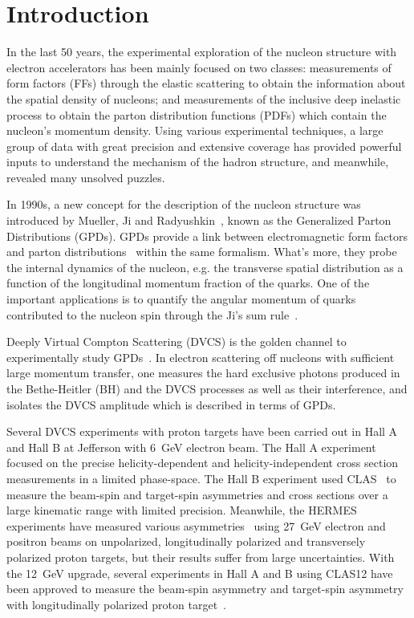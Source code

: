 \section {Introduction}
In the last 50 years, the experimental exploration of the nucleon structure with electron accelerators has been mainly focused on two classes: measurements of form factors (FFs) through the elastic scattering to obtain the information about the spatial density of nucleons; and measurements of the inclusive deep inelastic process to obtain the parton distribution functions (PDFs) which contain the nucleon's momentum density. Using various experimental techniques, a large group of data with great precision and extensive coverage has provided powerful inputs to understand the mechanism of the hadron structure, and meanwhile, revealed many unsolved puzzles.

In 1990s, a new concept for the description of the nucleon structure was introduced by Mueller, Ji and Radyushkin~\cite{Mueller:1998fv,Ji97-1,Ji97-2,Rad97}, known as the Generalized Parton Distributions (GPDs). GPDs provide a link between electromagnetic form factors and parton distributions~\cite{Die03,Bel05} within the same formalism. What's more, they probe the internal dynamics of the nucleon, e.g. the transverse spatial distribution as a function of the longitudinal momentum fraction of the quarks. One of the important applications is to quantify the angular momentum of quarks contributed to the nucleon spin through the Ji's sum rule~\cite{Ji97-1}.

Deeply Virtual Compton Scattering (DVCS) is the golden channel to experimentally study GPDs~\cite{Bel05}. In electron scattering off nucleons with sufficient large momentum transfer, one measures the hard exclusive photons produced in the Bethe-Heitler (BH) and the DVCS processes as well as their interference, and isolates the DVCS amplitude which is described in terms of GPDs.%

Several DVCS experiments with proton targets have been carried out in Hall A and Hall B at Jefferson with 6~GeV electron beam. The Hall A experiment~\cite{MunozCamacho:2006hx,Defurne:2015kxq} focused on the precise helicity-dependent and helicity-independent cross section measurements in a limited phase-space. The Hall B experiment used CLAS~\cite{PhysRevLett.100.162002,Jo:2015ema} to measure the beam-spin and target-spin asymmetries and cross sections over a large kinematic range with limited precision. Meanwhile, the HERMES experiments have measured various asymmetries~\cite{Airapetian:2001yk, Airapetian:2012mq, Airapetian:2010ab, Airapetian:2008aa, Airapetian:2011uq, Airapetian:2006zr, Airapetian:2009aa, Airapetian:2009bi} using 27~GeV electron and positron beams on unpolarized, longitudinally polarized and transversely polarized proton targets, but their results suffer from large uncertainties. With the 12~GeV upgrade, several experiments in Hall A and B using CLAS12 have been approved to measure the beam-spin asymmetry and target-spin asymmetry with longitudinally polarized proton target~\cite{halla:e12-06-114,clas12:e12-06-119}. 

